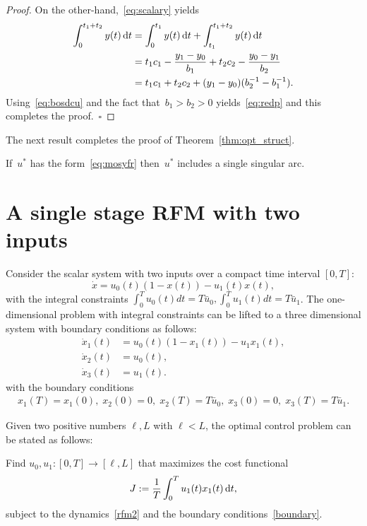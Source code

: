 \begin{proof}
	On the other-hand,~\eqref{eq:scalary} yields 
	\begin{subequations}
		\begin{align}\label{eq:odcp}
			\int _{0}^{t_1+t_2} y(t) \mathop{}\!\mathrm{d} t&=
			\int_{0}^{t_1} y(t) \mathop{}\!\mathrm{d} t + \int_{t_1}^{t_1+t_2} y(t) \mathop{}\!\mathrm{d} t \\&
			= t_1 c_1-\frac{y_1-y_0}{b_1} 
			+ t_2  c_2-\frac{y_0-y_1}{b_2} \\
			&=t_1 c_1+t_2 c_2+(y_1-y_0)(b_2^{-1}-b_1^{-1}). 
		\end{align}
	\end{subequations}
	Using~\eqref{eq:bosdcu} and the fact that~$b_1>b_2>0$
	yields~\eqref{eq:redp} and this completes the proof.~\hfill{$\square$}
\end{proof}

The next result completes the proof of 
Theorem~\ref{thm:opt_struct}.
\begin{lemma}
	If~$u^*$ has the form~\eqref{eq:mosyfr} then~$u^*$ includes a single singular arc. 
\end{lemma} 

\section{A single stage RFM with two inputs}

Consider the scalar system with two inputs over a compact time interval $[0,T]$:
\[ \dot x = u_0(t) (1-x(t)) - u_1(t) x(t),\] with the integral constraints $\int_0^T u_0 (t) dt= T \bar u_0, \int_0^T u_1 (t) dt= T\bar u_1$.  
The one-dimensional problem with integral constraints can be lifted to a three dimensional system with boundary conditions as follows:
\begin{subequations}
	\begin{align}\label{rfm2}
		\dot x_1(t)&=u_0(t) (1-x_1(t)) - u_1 x_1(t),  \\
		\dot x_2(t)&=u_0(t), \\ 
		\dot x_3(t)&=u_1(t).
	\end{align}
\end{subequations}
with the boundary conditions 
\begin{align} \label{boundary}
	x_1(T)=x_1(0),\;x_2(0)=0,\;    x_2(T)=T \bar u_0, \;  x_3(0)=0,\;    x_3(T)=T \bar u_1. 
\end{align}

Given two positive numbers $\ell,L$ with $\ell<L$, the optimal control problem can be stated as follows:
\begin{problem} \label{prob:optim2}
	Find $u_0, u_1 : [0,T] \to [\ell,L]$ that maximizes the cost functional
	\begin{equation}
	J:=\frac{1}{T}\int_0^T u_1(t) x_1(t) \mathop{}\!\mathrm{d} t,
	\end{equation}
	subject to the dynamics~\eqref{rfm2} and the boundary conditions~\eqref{boundary}.
\end{problem}

